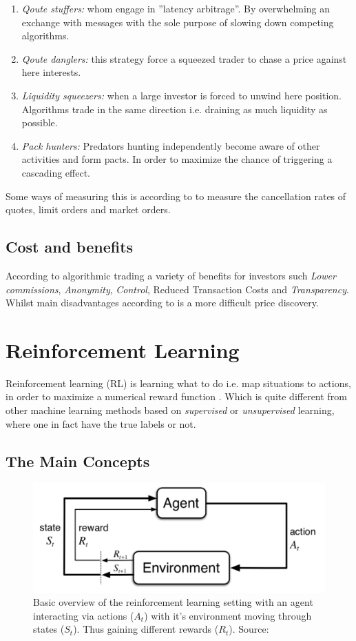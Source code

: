 \documentclass{kththesis}
\theoremstyle{definition}
\begin{document}
\begin{enumerate}
    \item \textit{Qoute stuffers:} whom engage in ''latency arbitrage''. By overwhelming an exchange with messages with the sole purpose of slowing down competing algorithms.
    \item \textit{Qoute danglers:} this strategy force a squeezed trader to chase a price against here interests. 
    \item \textit{Liquidity squeezers:} when a large investor is forced to unwind here position. Algorithms trade in the same direction i.e. draining as much liquidity as possible. 
    \item \textit{Pack hunters:} Predators hunting independently become aware of other activities and form pacts. In order to maximize the chance of triggering a cascading effect.   
\end{enumerate}
Some ways of measuring this is according to \textcite{de2018advances} to measure the cancellation rates of quotes, limit orders and market orders.

\subsection{Cost and benefits}
According to \textcite{kissell2013science} algorithmic trading a variety of benefits for investors such \textit{Lower commissions}, \textit{Anonymity}, \textit{Control}, {Reduced Transaction Costs} and \textit{Transparency}. Whilst main disadvantages according to \textcite{kissell2013science} is a more difficult price discovery.

\section{Reinforcement Learning}
Reinforcement learning (RL) is learning what to do i.e. map situations to actions, in order to maximize a numerical reward function \parencite{sutton1998reinforcement}. Which is quite different from other machine learning methods based on \textit{supervised} or \textit{unsupervised} learning, where one in fact have the true labels or not.
\subsection{The Main Concepts}
\begin{figure}[H]
    \centering
    \includegraphics[scale=1]{basicRL.png}
    \caption{Basic overview of the reinforcement learning setting with an agent interacting via actions ($A_t$) with it's environment moving through states ($S_t$). Thus gaining different rewards ($R_t$). Source: \textcite{sutton1998reinforcement} }
    \label{fig:4}
\end{figure}
\end{document}
